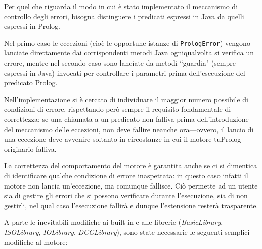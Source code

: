 \bigskip

Per quel che riguarda il modo in cui \`{e} stato implementato il meccanismo di controllo degli errori, bisogna distinguere i predicati espressi in Java da quelli espressi in Prolog. 

Nel primo caso le eccezioni (cio\`{e} le opportune istanze di \texttt{PrologError}) vengono lanciate direttamente dai corrispondenti metodi Java ogniqualvolta si verifica un errore, mentre nel secondo caso sono lanciate da metodi ``guardia" (sempre espressi in Java) invocati per controllare i parametri prima dell'esecuzione del predicato Prolog.

Nell'implementazione si \`{e} cercato di individuare il maggior numero possibile di condizioni di errore, rispettando per\`{o} sempre il requisito fondamentale di correttezza: se una chiamata a un predicato non falliva prima dell'introduzione del meccanismo delle eccezioni, non deve fallire neanche ora---ovvero, il lancio di una eccezione deve avvenire soltanto in circostanze in cui il motore tuProlog originario falliva.

La correttezza del comportamento del motore \`{e} garantita anche se ci si dimentica di identificare qualche condizione di errore inaspettata: in questo caso infatti il motore non lancia un'eccezione, ma comunque fallisce.
%
Ci\`{o} permette ad un utente sia di gestire gli errori che si possono verificare durante l'esecuzione, sia di non gestirli, nel qual caso l'esecuzione fallir\`{a} e dunque l'estensione rester\`{a} trasparente.

A parte le inevitabili modifiche ai built-in e alle librerie (\textit{BasicLibrary}, \textit{ISOLibrary}, \textit{IOLibrary}, \textit{DCGLibrary}), sono state necessarie le seguenti semplici modifiche al motore:

